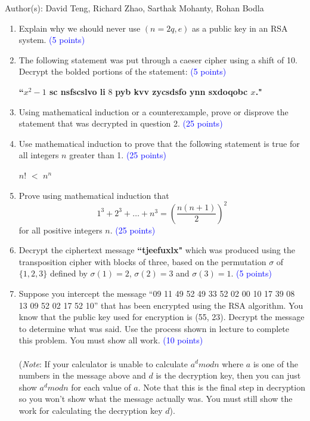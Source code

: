 \documentclass{article}
\newcommand{\pt}[1]{\textcolor{blue}{(#1 points)}}
\begin{document}
Author(s): David Teng, Richard Zhao, Sarthak Mohanty, Rohan Bodla
\newpage
\begin{enumerate}


\item Explain why we should never use $(n = 2q, e)$ as a public key in an RSA system. \pt{5}

\item The following statement was put through a caeser cipher using a shift of 10. Decrypt the bolded portions of the statement: \pt{5}\
\begin{center}
    \textbf{``$x^2-1$ sc nsfscslvo li} 8 \textbf{pyb kvv zycsdsfo ynn sxdoqobc $x$."}
\end{center}

\item Using mathematical induction or a counterexample, prove or disprove the statement that was decrypted in question 2. \pt{25}

\item Use mathematical induction to prove that the following statement is true for all integers $n$ greater than 1. \pt{25}
\begin{center}
    $n!$ $<$ $n^n$
\end{center}

\item Prove using mathematical induction that \[1^3 + 2^3 + \dots + n^3 = \left(\frac{n(n+1)}{2}\right)^2\] for all positive integers $n$. \pt{25}

\item Decrypt the ciphertext message \textbf{``tjeefuxlx"} which was produced using the transposition cipher with blocks of three, based on the permutation $\sigma$ of $\{1, 2, 3\}$ defined by $\sigma(1) = 2$, $\sigma(2) = 3$ and $\sigma(3) = 1$. \pt{5}

\item Suppose you intercept the message ``09 11 49 52 49 33 52 02 00 10 17 39 08 13 09 52 02 17 52 10” that has been encrypted using the RSA algorithm. You know that the public key used for encryption is (55, 23). Decrypt the message to determine what was said. Use the process shown in lecture to complete this problem. You must show all work. \pt{10}\\\\
(\emph{Note}: If your calculator is unable to calculate $a^dmod n$ where $a$ is one of the numbers in the message above
and $d$ is the decryption key, then you can just show $a^d mod n$ for each value of $a$. Note that this is the final step in decryption so you won’t show what the message actually was. You must still show the work for calculating the
decryption key $d$).


\end{enumerate}
\end{document}
